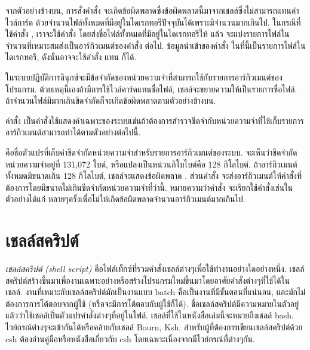 \begin{thwbr}
จากตัวอย่างข้างบน, การสั่งคำสั่ง  จะเกิดข้อผิดพลาดซึ่งข้อผิดพลาดนี้มาจากเชลล์ซึ่งไม่สามารถแทนค่าไวล์การ์ด \cmd{*} ด้วยจำนวนไฟล์ทั้งหมดที่มีอยู่ในไดเรกทอรีปัจจุบันได้เพราะมีจำนวนมากเกินไป. ในกรณีที่ใช้คำสั่ง , เราจะใช้คำสั่ง  โดยส่งชื่อไฟล์ทั้งหมดที่มีอยู่ในไดเรกทอรีให้  แล้ว  จะแบ่งรายการไฟล์ในจำนวนที่เหมาะสมส่งเป็นอาร์กิวเมนต์ของคำสั่ง  ต่อไป. ข้อมูลนำเข้าของคำสั่ง  ในที่นี้เป็นรายการไฟล์ในไดเรกทอรี, ดังนั้นอาจจะใช้คำสั่ง  แทน  ก็ได้.

ในระบบปฏิบัติการลินุกซ์จะมีข้อจำกัดของหน่วยความจำที่สามารถใช้กับรายการอาร์กิวเมนต์ของโปรแกรม. ด้วยเหตุนี้เองถ้ามีการใช้ไวล์คาร์ดแทนชื่อไฟล์, เชลล์จะขยายความให้เป็นรายการชื่อไฟล์. ถ้าจำนวนไฟล์มีมากเกินขีดจำกัดก็จะเกิดข้อผิดพลาดตามตัวอย่างข้างบน. 

คำสั่ง  เป็นคำสั่งใช้แสดงค่าเฉพาะของระบบเช่นถ้าต้องการสำรวจขีดจำกับหน่วยความจำที่ใช้เก็บรายการอาร์กิวเมนต์สามารถทำได้ตามตัวอย่างต่อไปนี้.
\begin{MyExample}
\end{MyExample}%
 คือชื่อตัวแปรที่เก็บค่าขีดจำกัดหน่วยความจำสำหรับรายการอาร์กิวเมนต์ของระบบ. จะเห็นว่าขีดจำกัดหน่วยความจำอยู่ที่ 131,072 ไบต์, หรือแปลงเป็นหน่วนกิโบไบต์คือ 128 กิโลไบต์. ถ้าอาร์กิวเมนต์ทั้งหมดมีขนาดเกิน 128 กิโลไบต์, เชลล์จะแสดงข้อผิดพลาด . ส่วนคำสั่ง  จะส่งอาร์กิวเมนต์ให้คำสั่งที่ต้องการโดยมีขนาดไม่เกินขีดจำกัดหน่วยความจำที่ว่านี้. หมายความว่าคำสั่ง  จะเรียกใช้คำสั่งเช่นในตัวอย่างได้แก่  หลายๆครั้งเพื่อไม่ให้เกิดข้อผิดพลาดจำนวนอาร์กิวเมนต์มากเกินไป.




\section{เชลล์สคริปต์}
\emph{เชลล์สคริปต์ (shell script)} คือไฟล์เท็กซ์ที่รวมคำสั่งเชลล์ต่างๆเพื่อใช้ทำงานอย่างใดอย่างหนึ่ง. เชลล์สคริปต์สร้างขึ้นมาเพื่องานเฉพาะอย่างหรือสร้างโปรแกรมใหม่ขึ้นมาโดยอาศัยคำสั่งต่างๆที่ใช้ได้ในเชลล์. งานที่เหมาะกับเชลล์สคริปต์มักเป็นงานแบบ batch คือเป็นงานที่มีขั้นตอนที่แน่นอน, และมักไม่ต้องการการโต้ตอบจากผู้ใช้ (หรือจะมีการโต้ตอบกับผู้ใช้ก็ได้). ชื่อเชลล์สคริปต์มีความหมายในตัวอยู่แล้วว่าใช้เชลล์เป็นตัวแปรคำสั่งต่างๆที่อยู่ในไฟล์. เชลล์ที่ใช้ในหนังสือเล่มนี้จะหมายถึงเชลล์ bash. ไวย์กรณ์ต่างๆจะเข้ากันได้หรือคล้ายกับเชลล์ Bourn, Ksh. สำหรับผู้ที่ต้องการเขียนเชลล์สคริปต์ด้วย csh ต้องอ่านคู่มือหรือหนังสือเกี่ยวกับ csh โดยเฉพาะเนื่องจากมีไวย์กรณ์ที่ต่างๆกัน.


\end{thwbr}
